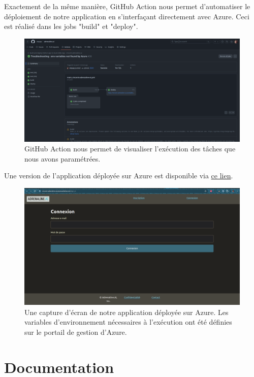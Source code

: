 \documentclass[french]{article}
\begin{document}
    Exactement de la même manière, GitHub Action nous permet d'automatiser le déploiement de notre application en s'interfaçant directement avec Azure. Ceci est réalisé dans les jobs "build" et "deploy".
    \begin{figure}[h!]
        \includegraphics[width=12cm]{gh_action_1}
        \centering
        \caption{GitHub Action nous permet de visualiser l'exécution des tâches que nous avons paramétrées.}
        \centering
    \end{figure}
    
    Une version de l'application déployée sur Azure est disponible via \href{https://vincent-adrenaline-ai.azurewebsites.net/}{ce lien}. 

    \begin{figure}[h!]
        \includegraphics[width=12cm]{azure}
        \centering
        \caption{Une capture d'écran de notre application déployée sur Azure. Les variables d'environnement nécessaires à l'exécution ont été définies sur le portail de gestion d'Azure.}
        \centering
    \end{figure}
    
    \section{Documentation}
\end{document}
